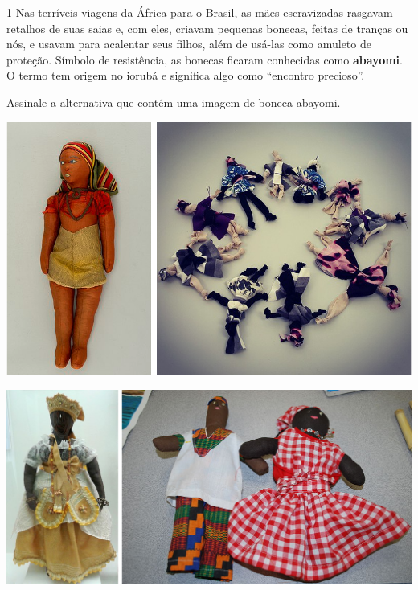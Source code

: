 \num{1}  Nas terríveis viagens da África para o Brasil, as mães escravizadas
rasgavam retalhos de suas saias e, com eles, criavam pequenas bonecas, feitas
de tranças ou nós, e usavam para acalentar seus filhos, além de usá-las como
amuleto de proteção. Símbolo de resistência, as bonecas ficaram conhecidas
como \textbf{abayomi}. O termo tem origem no iorubá e significa algo como
“encontro precioso”.

Assinale a alternativa que contém uma imagem de boneca abayomi.

\begin{minipage}{.8\textwidth}
\includegraphics[width=\textwidth]{./imgs/art30ab.png}

\includegraphics[width=\textwidth]{./imgs/art30cd.png}
\end{minipage}\hspace{.5cm}
\begin{minipage}{.2\textwidth}
\end{minipage}\pagebreak

